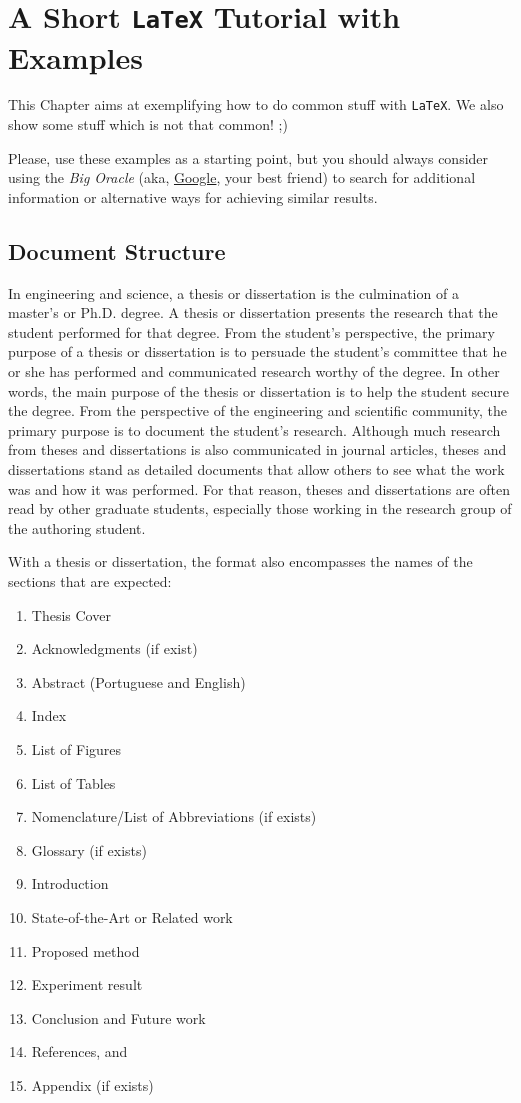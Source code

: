 \chapter{A Short \texttt{LaTeX} Tutorial with Examples}
\label{cha:a_short_latex_tutorial_with_examples}

This Chapter aims at exemplifying how to do common stuff with \texttt{LaTeX}. We also show some stuff which is not that common! ;) 

Please, use these examples as a starting point, but you should always consider using the \emph{Big Oracle} (aka, \href{http://www.google.com}{Google}, your best friend) to search for additional information or alternative ways for achieving similar results.


\section{Document Structure} %
\label{sec:document_structure}

In engineering and science, a thesis or dissertation is the culmination of a master's or Ph.D. degree. A thesis or dissertation presents the research that the student performed for that degree. From the student's perspective, the primary purpose of a thesis or dissertation is to persuade the student's committee that he or she has performed and communicated research worthy of the degree. In other words, the main purpose of the thesis or dissertation is to help the student secure the degree. From the perspective of the engineering and scientific community, the primary purpose is to document the student's research. Although much research from theses and dissertations is also communicated in journal articles, theses and dissertations stand as detailed documents that allow others to see what the work was and how it was performed. For that reason, theses and dissertations are often read by other graduate students, especially those working in the research group of the authoring student. 
	
With a thesis or dissertation, the format also encompasses the names of the sections that are expected: 
\begin{enumerate}
\item Thesis Cover
\item Acknowledgments (if exist)
\item Abstract (Portuguese and English)
\item Index
\item List of Figures
\item List of Tables
\item Nomenclature/List of Abbreviations (if exists)
\item Glossary (if exists)
\item Introduction
\item State-of-the-Art or Related work
\item Proposed method
\item Experiment result
\item Conclusion and Future work
\item References, and 
\item Appendix (if exists)
\end{enumerate}
 
